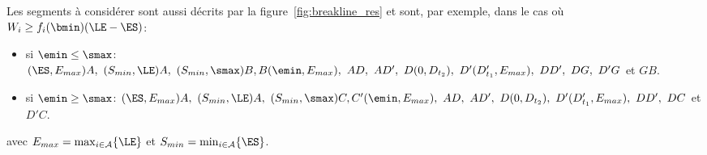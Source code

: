  Les segments à considérer sont aussi décrits par la
 figure~\ref{fig:breakline_res} et sont, par exemple, dans le cas où
 $W_i \ge f_i(\bmin) (\LE-\ES)$:
 \begin{itemize}
 \item si $\emin \le \smax$: $(\ES ,E_{max})A,\ (S_{min},
   \LE)A,\ (S_{min},\smax)B, \\B(\emin,E_{max}),\ AD,\ AD',\
   D(0,D_{t_2}),\ D'(D'_{t_1},E_{max}),\ DD' ,\ DG,\ D'G$ et $GB$.
 \item si $\emin \ge \smax$: $(\ES ,E_{max})A,\ (S_{min},
   \LE)A,\ (S_{min},\smax)C,\\ C'(\emin,E_{max}),\ AD,\ AD',\
   D(0,D_{t_2}),\ D'(D'_{t_1},E_{max}),\ DD' ,\ DC$ et $D'C$.
 \end{itemize}
avec $E_{max}=\max_{i \in \A}\{\LE\}$ et $S_{min}=\min_{i \in
  \A}\{\ES\}$. 


